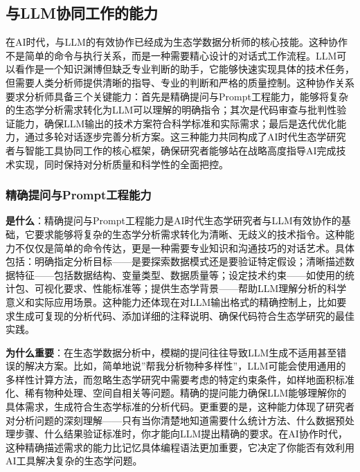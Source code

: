 \documentclass[
  twoside]{book}
\begin{document}
\hypertarget{ux4e0ellmux534fux540cux5de5ux4f5cux7684ux80fdux529b}{%
\subsection{与LLM协同工作的能力}\label{ux4e0ellmux534fux540cux5de5ux4f5cux7684ux80fdux529b}}

在AI时代，与LLM的有效协作已经成为生态学数据分析师的核心技能。这种协作不是简单的命令与执行关系，而是一种需要精心设计的对话式工作流程。LLM可以看作是一个知识渊博但缺乏专业判断的助手，它能够快速实现具体的技术任务，但需要人类分析师提供清晰的指导、专业的判断和严格的质量控制。这种协作关系要求分析师具备三个关键能力：首先是精确提问与Prompt工程能力，能够将复杂的生态学分析需求转化为LLM可以理解的明确指令；其次是代码审查与批判性验证能力，确保LLM输出的技术方案符合科学标准和实际需求；最后是迭代优化能力，通过多轮对话逐步完善分析方案。这三种能力共同构成了AI时代生态学研究者与智能工具协同工作的核心框架，确保研究者能够站在战略高度指导AI完成技术实现，同时保持对分析质量和科学性的全面把控。

\hypertarget{ux7cbeux786eux63d0ux95eeux4e0epromptux5de5ux7a0bux80fdux529b}{%
\subsubsection{精确提问与Prompt工程能力}\label{ux7cbeux786eux63d0ux95eeux4e0epromptux5de5ux7a0bux80fdux529b}}

\textbf{是什么}：精确提问与Prompt工程能力是AI时代生态学研究者与LLM有效协作的基础，它要求能够将复杂的生态学分析需求转化为清晰、无歧义的技术指令。这种能力不仅仅是简单的命令传达，更是一种需要专业知识和沟通技巧的对话艺术。具体包括：明确指定分析目标------是要探索数据模式还是要验证特定假设；清晰描述数据特征------包括数据结构、变量类型、数据质量等；设定技术约束------如使用的统计包、可视化要求、性能标准等；提供生态学背景------帮助LLM理解分析的科学意义和实际应用场景。这种能力还体现在对LLM输出格式的精确控制上，比如要求生成可复现的分析代码、添加详细的注释说明、确保代码符合生态学研究的最佳实践。

\textbf{为什么重要}：在生态学数据分析中，模糊的提问往往导致LLM生成不适用甚至错误的解决方案。比如，简单地说''帮我分析物种多样性''，LLM可能会使用通用的多样性计算方法，而忽略生态学研究中需要考虑的特定约束条件，如样地面积标准化、稀有物种处理、空间自相关等问题。精确的提问能力确保LLM能够理解你的具体需求，生成符合生态学标准的分析代码。更重要的是，这种能力体现了研究者对分析问题的深刻理解------只有当你清楚地知道需要什么统计方法、什么数据预处理步骤、什么结果验证标准时，你才能向LLM提出精确的要求。在AI协作时代，这种精确描述需求的能力比记忆具体编程语法更加重要，它决定了你能否有效利用AI工具解决复杂的生态学问题。
\end{document}
